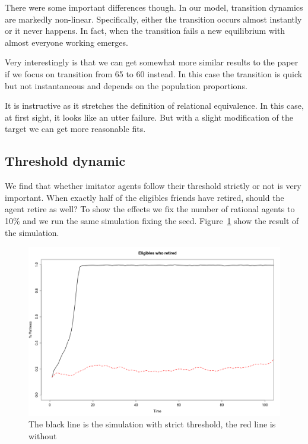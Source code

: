 \documentclass[runningheads,a4paper]{article}
\begin{document}
There were some important differences though.
In our model, transition dynamics are markedly non-linear.
Specifically, either the transition occurs almost instantly or it never happens.
In fact, when the transition fails a new equilibrium with almost everyone working emerges.

Very interestingly is that we can get somewhat more similar results to the paper if we focus on transition from 65 to 60 instead.
In this case the transition is quick but not instantaneous and depends on the population proportions.

It is instructive as it stretches the definition of relational equivalence.
In this case, at first sight, it looks like an utter failure.
But with a slight modification of the target we can get more reasonable fits.

\subsection{Threshold dynamic}

We find that whether imitator agents follow their threshold strictly or not is very important.
When exactly half of the eligibles friends have retired, should the agent retire as well?
To show the effects we fix the number of rational agents to 10\% and we run the same simulation fixing the seed.
Figure~\ref{laxstrict} show the result of the simulation.

\begin{figure}
 \begin{center}
  \includegraphics[scale=.30]{figs/laxstrict.png}
\caption{The black line is the simulation with strict threshold, the red line is without}
\label{laxstrict}
 \end{center}
\end{figure}
\end{document}
